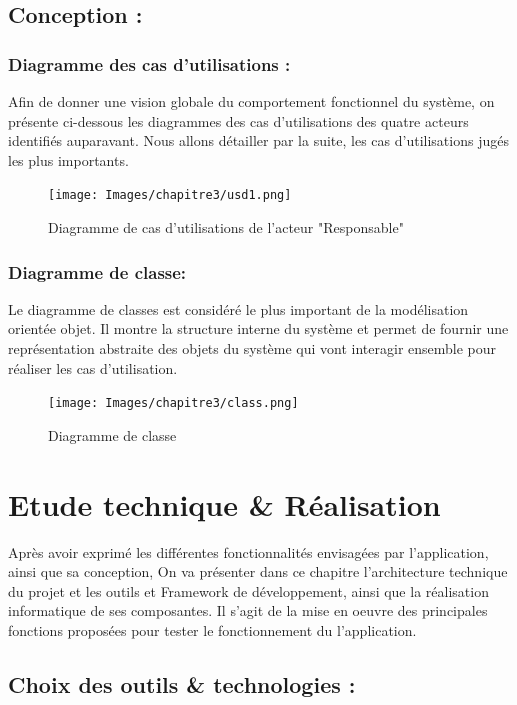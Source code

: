 \documentclass[12pt,a4paper,twoside]{report}
\begin{document}
	\section{Conception :}{
		
			\subsection{Diagramme des cas d'utilisations :}{
				Afin de donner une vision globale du comportement fonctionnel du système, on présente ci-dessous les diagrammes des cas d’utilisations des quatre acteurs identifiés auparavant. Nous allons détailler par la suite, les cas d’utilisations jugés les plus importants.
								\begin{figure}[H]
									 \texttt{[image: Images/chapitre3/usd1.png]}
									 \centering
									 \caption{\label{usd1} Diagramme de cas d'utilisations de l'acteur "Responsable"}
								\end{figure}
						
			}
	
		\subsection{Diagramme de classe:}{
			Le diagramme de classes est considéré le plus important de la modélisation orientée objet. Il montre la structure interne du système et permet de fournir une représentation abstraite des objets du système qui vont interagir ensemble pour réaliser les cas d’utilisation.
				\begin{figure}[H]
					 \texttt{[image: Images/chapitre3/class.png]}
					 \centering
					 \caption{\label{classe} Diagramme de classe}
				\end{figure}
		}
	}
	
	\newpage
	
	\chapter{Etude technique \& Réalisation}{
		Après avoir exprimé les différentes fonctionnalités envisagées par l’application, ainsi que sa conception, On va présenter dans ce chapitre l’architecture technique du projet et les outils et Framework de développement, ainsi que la réalisation informatique de ses composantes. Il s’agit de la mise en oeuvre des principales fonctions proposées pour tester le fonctionnement du l’application.
	\newpage
	}
	\section{Choix des outils \& technologies :}{
	}
\end{document}
